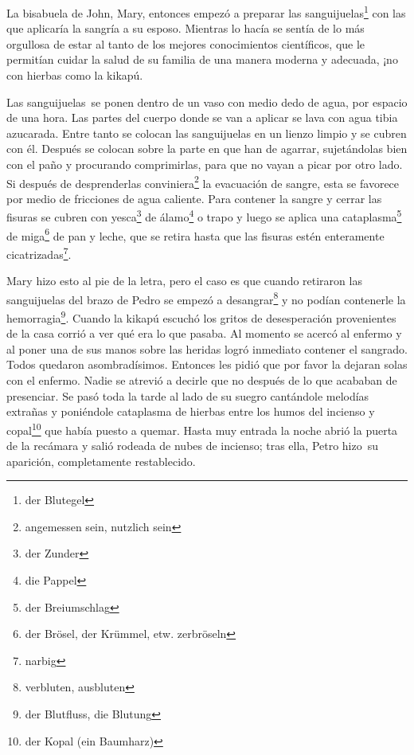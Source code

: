 La bisabuela de John, Mary, entonces empezó a preparar las sanguijuelas\footnote{der Blutegel} con las que aplicaría
la sangría a su esposo. Mientras lo hacía se sentía de lo más orgullosa
de estar al tanto de los mejores conocimientos científicos, que le
permitían cuidar la salud de su familia de una manera moderna y adecuada,
¡no con hierbas como \glqq{}la kikapú\grqq{}.

Las sanguijuelas~se ponen dentro de un vaso con medio dedo de
agua, por espacio de una hora. Las partes del cuerpo donde se van a
aplicar se lava con agua tibia azucarada. Entre tanto se colocan las
sanguijuelas en un lienzo limpio y se cubren con él. Después se colocan
sobre la parte en que han de agarrar, sujetándolas bien con el paño y
procurando comprimirlas, para que no vayan a picar por otro lado. Si
después de desprenderlas conviniera\footnote{angemessen sein, nutzlich sein}
la evacuación de sangre, esta se favorece por medio de fricciones de agua
caliente. Para contener la sangre y cerrar las fisuras se cubren con yesca\footnote{der Zunder}
de álamo\footnote{die Pappel} o trapo y luego
se aplica una cataplasma\footnote{der Breiumschlag}
de miga\footnote{der Brösel, der Krümmel, etw. zerbröseln}
de pan y leche, que se retira hasta que las fisuras estén enteramente cicatrizadas\footnote{narbig}.

Mary hizo esto al pie de la letra, pero el caso es que cuando retiraron
las sanguijuelas del brazo de Pedro se empezó a desangrar\footnote{verbluten, ausbluten} y no podían
contenerle la hemorragia\footnote{der Blutfluss, die Blutung}.
Cuando \glqq{}la kikapú\grqq{} escuchó los gritos de desesperación provenientes de
la casa corrió a ver qué era lo que pasaba. Al momento se acercó al enfermo
y al poner una de sus manos sobre las heridas logró inmediato contener
el sangrado. Todos quedaron asombradísimos. Entonces les pidió que por
favor la dejaran solas con el enfermo. Nadie se atrevió a decirle que
no después de lo que acababan de presenciar. Se pasó toda la tarde al lado
de su suegro cantándole melodías extrañas y poniéndole cataplasma de hierbas
entre los humos del incienso y copal\footnote{der Kopal (ein Baumharz)}
que había puesto a quemar. Hasta muy entrada la noche abrió la puerta
de la recámara y salió rodeada de nubes de incienso; tras ella, Petro
hizo~su aparición, completamente restablecido.

